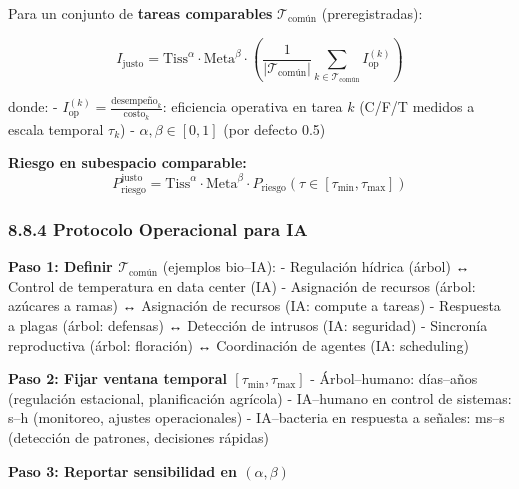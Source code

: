 Para un conjunto de \textbf{tareas comparables}
\(\mathcal{T}_{\text{común}}\) (preregistradas):

\[
I_{\text{justo}} = \text{Tiss}^\alpha \cdot \text{Meta}^\beta \cdot \left(\frac{1}{|\mathcal{T}_{\text{común}}|} \sum_{k \in \mathcal{T}_{\text{común}}} I_{\text{op}}^{(k)}\right)
\]

donde: -
\(I_{\text{op}}^{(k)} = \frac{\text{desempeño}_k}{\text{costo}_k}\):
eficiencia operativa en tarea \(k\) (C/F/T medidos a escala temporal
\(\tau_k\)) - \(\alpha, \beta \in [0,1]\) (por defecto 0.5)

\textbf{Riesgo en subespacio comparable:} \[
P_{\text{riesgo}}^{\text{justo}} = \text{Tiss}^\alpha \cdot \text{Meta}^\beta \cdot P_{\text{riesgo}}(\tau \in [\tau_{\min}, \tau_{\max}])
\]

\subsubsection{8.8.4 Protocolo Operacional para
IA}\label{protocolo-operacional-para-ia}

\textbf{Paso 1: Definir \(\mathcal{T}_{\text{común}}\)} (ejemplos
bio--IA): - Regulación hídrica (árbol) ↔ Control de temperatura en data
center (IA) - Asignación de recursos (árbol: azúcares a ramas) ↔
Asignación de recursos (IA: compute a tareas) - Respuesta a plagas
(árbol: defensas) ↔ Detección de intrusos (IA: seguridad) - Sincronía
reproductiva (árbol: floración) ↔ Coordinación de agentes (IA:
scheduling)

\textbf{Paso 2: Fijar ventana temporal \([\tau_{\min}, \tau_{\max}]\)} -
Árbol--humano: días--años (regulación estacional, planificación
agrícola) - IA--humano en control de sistemas: s--h (monitoreo, ajustes
operacionales) - IA--bacteria en respuesta a señales: ms--s (detección
de patrones, decisiones rápidas)

\textbf{Paso 3: Reportar sensibilidad en \((\alpha, \beta)\)}

